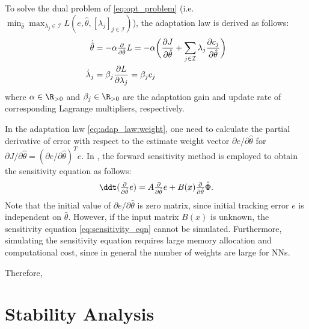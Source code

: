 \documentclass[conference]{IEEEtran}
\newcommand\ie{\textrm{i.e.\ }}
\begin{document}
To solve the dual problem of \eqref{eq:opt_problem} (\ie $\min_{\hat\theta} \max_{\lambda_j\in\mathcal I} \allowbreak  L(e,\hat\theta,[\lambda_j]_{j\in\mathcal I})$), the adaptation law is derived as follows:
\begin{subequations}
	\begin{align}
		\dot {\hat\theta}&=-\alpha 
		\tfrac{\partial}{\partial \hat\theta} L
		=-\alpha 
		\bigg(
		{\partial J\over \partial \hat\theta}+\sum_{j\in\mathcal{I}}\lambda_j {\partial c_j\over\partial \hat\theta}
	\label{eq:adap_law:weight}
		\bigg)\\
		\dot\lambda_j& = \beta_j{\partial L\over\partial \lambda_j} = \beta_j c_j 
	\label{eq:adap_law:multiplier}
	\end{align}
	\label{eq:adap_law}
\end{subequations}
where $\alpha\in\R_{>0}$ and $\beta_j\in\R_{>0}$ are the adaptation gain and update rate of corresponding Lagrange multipliers, respectively.

In the adaptation law \eqref{eq:adap_law:weight}, one need to calculate the partial derivative of error with respect to the estimate weight vector $\partial e/\partial \hat\theta$ for $\partial J/\partial \hat\theta = (\partial e/\partial \hat\theta)^T e$.
In \cite{Ryu:2024aa}, the forward sensitivity method \cite{Sengupta:2014aa} is employed to obtain the sensitivity equation as follows:
\begin{equation}
	\ddt
	(
		\tfrac{\partial}{\partial \hat\theta} e
	)
	= 
	A
	\tfrac{\partial}{\partial \hat\theta} e
	+
	B(x)
	\tfrac{\partial}{\partial \hat\theta} \hat\Phi
	.
	\label{eq:sensitivity_eqn}
\end{equation}
Note that the initial value of $\partial e/\partial \hat\theta$ is zero matrix, since initial tracking error $e$ is independent on $\hat\theta$.
However, if the input matrix $B(x)$ is unknown, the sensitivity equation \eqref{eq:sensitivity_eqn} cannot be simulated.
Furthermore, simulating the sensitivity equation requires large memory allocation and computational cost, since in general the number of weights are large for NNs.

Therefore, 


\section{Stability Analysis}    
\end{document}
